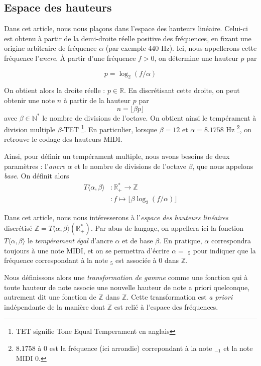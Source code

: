 \documentclass{article}
\begin{document}
\subsection{Espace des hauteurs}
Dans cet article, nous nous plaçons dans l'espace des hauteurs linéaire. Celui-ci est obtenu à partir de la demi-droite réelle positive des fréquences, en fixant une origine arbitraire de fréquence $\alpha$ (par exemple $440$ Hz). Ici, nous appellerons cette fréquence l'\emph{ancre}.  À partir d'une fréquence $f>0$, on détermine une hauteur $p$ par

$$p = \log_2(f/\alpha)$$

On obtient alors la droite réelle : $p\in \mathbb{R}$. En discrétisant cette droite, on peut obtenir une note $n$ à partir de la hauteur $p$ par 
$$n = \lfloor \beta p \rfloor$$
\noindent avec $\beta\in \mathbb{N}^*$ le nombre de divisions de l'octave. On obtient ainsi le tempérament à division multiple $\beta$-TET \footnote{TET signifie Tone Equal Temperament en anglais}. En particulier, lorsque $\beta = 12$ et $\alpha = 8.1758$ Hz \footnote{ $8.1758$ à $0$ est la fréquence (ici arrondie) correpondant à la note $_{-1}$ et la note MIDI $0$.}, on retrouve le codage des hauteurs MIDI.

Ainsi, pour définir un tempérament multiple, nous avons besoins de deux paramètres : l'\emph{ancre} $\alpha$  et le nombre de divisions de l'octave $\beta$, que nous appelons \emph{base}. On définit alors \begin{align*}
  T\langle \alpha, \beta \rangle &: \mathbb{R}_+^* \rightarrow \mathbb{Z}\\
  &:f \mapsto \lfloor \beta \log_2(f/\alpha)\rfloor
\end{align*}


Dans cet article, nous nous intéresserons à l'\emph{espace des hauteurs linéaires} discrétisé $\mathbb{Z} = T\langle\alpha, \beta \rangle (\mathbb{R^*_+})$. Par abus de langage, on appellera ici la fonction $T\langle \alpha, \beta \rangle$ le \emph{tempérament égal} d'ancre $\alpha$ et de base $\beta$. En pratique, $\alpha$ correspondra toujours à une note MIDI, et on se permettra d'écrire $\alpha =$ $_5$ pour indiquer que la fréquence correspondant à la note $_5$ est associée à $0$ dans $\mathbb{Z}$.

Nous définissons alors une \emph{transformation de gamme} comme une fonction qui à toute hauteur de note associe une nouvelle hauteur de note a priori quelconque, autrement dit une fonction de $\mathbb{Z}$ dans $\mathbb{Z}$. Cette transformation est \emph{a priori} indépendante de la manière dont $\mathbb{Z}$ est relié à l'espace des fréquences.
\end{document}
